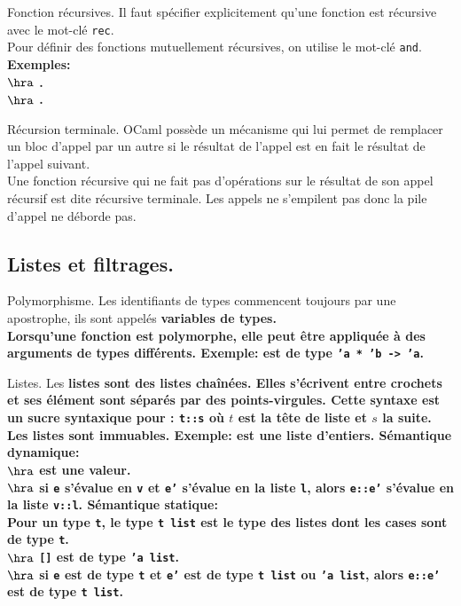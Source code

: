 \documentclass[french, 11pt]{article}
\begin{document}
\begin{defi}{Fonction récursives.}{}
    Il faut spécifier explicitement qu'une fonction est récursive avec le mot-clé \texttt{rec}.\\
    Pour définir des fonctions mutuellement récursives, on utilise le mot-clé \texttt{and}.\\
    \bf{Exemples:}\\
    $\hra$ .\\
    $\hra$ .
\end{defi}

\begin{defi}{Récursion terminale.}{}
    OCaml possède un mécanisme qui lui permet de remplacer un bloc d'appel par un autre si le résultat de l'appel est en fait le résultat de l'appel suivant.\\
    Une fonction récursive qui ne fait pas d'opérations sur le résultat de son appel récursif est dite récursive terminale. Les appels ne s'empilent pas donc la pile d'appel ne déborde pas.
\end{defi}

\subsection{Listes et filtrages.}

\begin{defi}{Polymorphisme.}{}
    Les identifiants de types commencent toujours par une apostrophe, ils sont appelés \bf{variables de types}.\\
    Lorsqu'une fonction est \bf{polymorphe}, elle peut être appliquée à des arguments de types différents.\n
    \bf{Exemple:}  est de type \texttt{'a * 'b -> 'a}.
\end{defi}

\begin{defi}{Listes.}{}
    Les \bf{listes} sont des listes chaînées. Elles s'écrivent entre crochets et ses élément sont séparés par des points-virgules.
    Cette syntaxe est un sucre syntaxique pour : \texttt{t::s} où $t$ est la tête de liste et $s$ la suite.
    Les listes sont immuables.\n
    \bf{Exemple:} \ocaml{[1; 2; 3]} est une liste d'entiers.\n
    \bf{Sémantique dynamique:}\\
    $\hra$ \ocaml{[]} est une valeur.\\
    $\hra$ si \texttt{e} s'évalue en \texttt{v} et \texttt{e'} s'évalue en la liste \texttt{l}, alors \texttt{e::e'} s'évalue en la liste \texttt{v::l}.\n
    \bf{Sémantique statique:}\\
    Pour un type \texttt{t}, le type \texttt{t list} est le type des listes dont les cases sont de type \texttt{t}.\\
    $\hra$ \texttt{[]} est de type \texttt{'a list}.\\
    $\hra$ si \texttt{e} est de type \texttt{t} et \texttt{e'} est de type \texttt{t list} ou \texttt{'a list}, alors \texttt{e::e'} est de type \texttt{t list}.
\end{defi}
\end{document}
